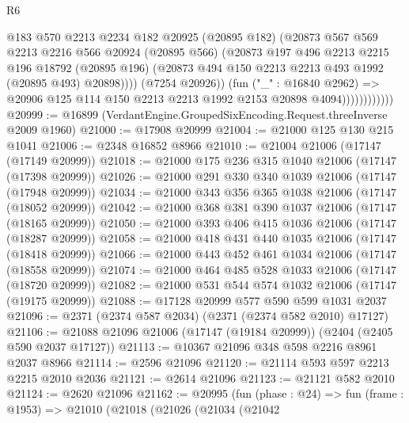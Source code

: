 \begin{lexlean}{R6}
\begin{coremodule}
                              @183
                              @570
                              @2213
                              @2234
                              @182
                              @20925
                              (@20895 @182)
                              (@20873
                                @567
                                @569
                                @2213
                                @2216
                                @566
                                @20924
                                (@20895 @566)
                                (@20873
                                  @197
                                  @496
                                  @2213
                                  @2215
                                  @196
                                  @18792
                                  (@20895 @196)
                                  (@20873 @494 @150 @2213 @2213 @493 @1992 (@20895 @493) @20898))))
                            (@7254 @20926))
                          (fun ("_" : @16840 @2962) =>
                          @20906 @125 @114 @150 @2213 @2213 @1992 @2153 @20898 @4094))))))))))))
@20999 := @16899 (VerdantEngine.GroupedSixEncoding.Request.threeInverse @2009 @1960)
@21000 := @17908 @20999
@21004 := @21000 @125 @130 @215 @1041
@21006 := @2348 @16852 @8966
@21010 := @21004 @21006 (@17147 (@17149 @20999))
@21018 := @21000 @175 @236 @315 @1040 @21006 (@17147 (@17398 @20999))
@21026 := @21000 @291 @330 @340 @1039 @21006 (@17147 (@17948 @20999))
@21034 := @21000 @343 @356 @365 @1038 @21006 (@17147 (@18052 @20999))
@21042 := @21000 @368 @381 @390 @1037 @21006 (@17147 (@18165 @20999))
@21050 := @21000 @393 @406 @415 @1036 @21006 (@17147 (@18287 @20999))
@21058 := @21000 @418 @431 @440 @1035 @21006 (@17147 (@18418 @20999))
@21066 := @21000 @443 @452 @461 @1034 @21006 (@17147 (@18558 @20999))
@21074 := @21000 @464 @485 @528 @1033 @21006 (@17147 (@18720 @20999))
@21082 := @21000 @531 @544 @574 @1032 @21006 (@17147 (@19175 @20999))
@21088 := @17128 @20999 @577 @590 @599 @1031 @2037
@21096 := @2371 (@2374 @587 @2034) (@2371 (@2374 @582 @2010) @17127)
@21106 := @21088 @21096 @21006 (@17147 (@19184 @20999)) (@2404 (@2405 @590 @2037 @17127))
@21113 := @10367 @21096 @348 @598 @2216 @8961 @2037 @8966
@21114 := @2596 @21096
@21120 := @21114 @593 @597 @2213 @2215 @2010 @2036
@21121 := @2614 @21096
@21123 := @21121 @582 @2010
@21124 := @2620 @21096
@21162 := @20995
    (fun (phase : @24) =>
    fun (frame : @1953) =>
    @21010
      (@21018
        (@21026
          (@21034
            (@21042

\end{coremodule}
\end{lexlean}
